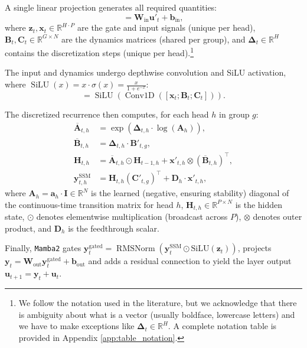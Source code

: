 \documentclass{article}
\theoremstyle{plain}
\theoremstyle{definition}
\theoremstyle{remark}
\begin{document}
A single linear projection generates all required quantities:
\begin{equation}
[\bm{z}_t; \bm{x}_t; \bm{B}_t; \bm{C}_t; \bm{\Delta}_t] = \bm{W}_{\text{in}}\bm{u}'_t + \bm{b}_{\text{in}},
\label{eq:app_mamba2_projection}
\end{equation}
where $\bm{z}_t, \bm{x}_t \in \mathbb{R}^{H \cdot P}$ are the gate and input signals (unique per head), $\bm{B}_t, \bm{C}_t \in \mathbb{R}^{G \times N}$ are the dynamics matrices (shared per group), and $\bm{\Delta}_t \in \mathbb{R}^H$ contains the discretization steps (unique per head).\footnote{We follow the notation used in the literature, but we acknowledge that there is ambiguity about what is a vector (usually boldface, lowercase letters) and we have to make exceptions like $\bm{\Delta}_t \in \mathbb{R}^H$. A complete notation table is provided in Appendix \ref{app:table_notation}.}

The input and dynamics undergo depthwise convolution and SiLU activation, where $\operatorname{SiLU}(x) = x \cdot \sigma(x) = \frac{x}{1 + e^{-x}}$:
\begin{equation}
[\bm{x}'_t; \bm{B}'_t; \bm{C}'_t] = \operatorname{SiLU}(\operatorname{Conv1D}([\bm{x}_t; \bm{B}_t; \bm{C}_t])).
\label{eq:app_mamba2_conv}
\end{equation}

The discretized recurrence then computes, for each head $h$ in group $g$:
\begin{align}
\overline{\bm{A}}_{t,h} &= \exp(\bm{\Delta}_{t,h} \cdot \log(\bm{A}_h)), \label{eq:app_discretize_A} \\
\overline{\bm{B}}_{t,h} &= \bm{\Delta}_{t,h} \cdot \bm{B}'_{t,g}, \label{eq:app_discretize_B} \\
\bm{H}_{t,h} &= \overline{\bm{A}}_{t,h} \odot \bm{H}_{t-1,h} + \bm{x}'_{t,h} \otimes ( \overline{\bm{B}}_{t,h} )^\top, \label{eq:app_hidden_update} \\
\bm{y}^{\text{SSM}}_{t,h} &= \bm{H}_{t,h} (\bm{C}'_{t,g})^\top + \bm{D}_h \cdot \bm{x}'_{t,h}, \label{eq:app_output_compute}
\end{align}
where $\bm{A}_h = \bm{a}_h \cdot \bm{I} \in \mathbb{R}^N$ is the learned (negative, ensuring stability) diagonal of the continuous-time transition matrix for head $h$, $\bm{H}_{t,h} \in \mathbb{R}^{P \times N}$ is the hidden state, $\odot$ denotes elementwise multiplication (broadcast across $P$), $\otimes$ denotes outer product, and $\bm{D}_h$ is the feedthrough scalar. 

Finally, \texttt{Mamba2} gates $\bm{y}^{\text{gated}}_t = \operatorname{RMSNorm} ( \bm{y}^{\text{SSM}}_t \odot \text{SiLU}(\bm{z}_t) )$, projects $\bm{y}_t = \bm{W}_{\text{out}} \bm{y}^{\text{gated}}_t + \bm{b}_{\text{out}}$ and adds a residual connection to yield the layer output $\bm{u}_{t+1} = \bm{y}_t + \bm{u}_t$.
\end{document}
